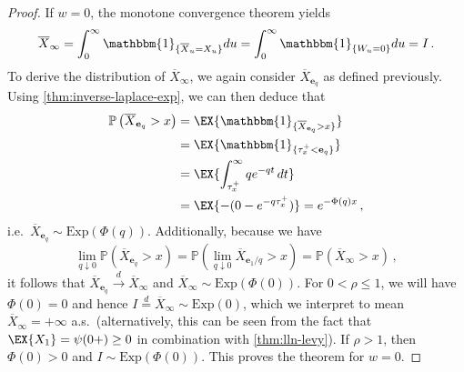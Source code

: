 \documentclass[titlepage]{article}
\theoremstyle{plain}
\theoremstyle{definition}
\DeclareRobustCommand{\probX}[2][{\mathbb{P}}]{\ensuremath{ {#1}\left( {#2} \right)}}
\begin{document}
\begin{proof}
  If $w = 0$, the monotone convergence theorem yields
  \begin{equation}
    \overline{X}_\infty = \int_0^\infty \mathbbm{1}_{\{ \overline{X}_u = X_u \}} du = \int_0^\infty \mathbbm{1}_{\{ W_u = 0 \}} du = I \,.
  \end{equation}
  To derive the distribution of $\overline{X}_\infty$, we again consider $\overline{X}_{\mathbf{e}_q}$ as defined previously. Using \cref{thm:inverse-laplace-exp}, we can then deduce that
  \begin{align}
    \probX{\overline{X}_{\mathbf{e}_q} > x} & = \EX{\mathbbm{1}_{\{\overline{X}_{\mathbf{e}_q} > x \}}} \\
                                            & = \EX{\mathbbm{1}_{\{ \tau_x^+ < \mathbf{e}_q \}}}        \\
                                            & = \EX{\int_{\tau_x^+}^\infty q e^{-qt} \, dt}             \\
                                            & = \EX{-(0 - e^{-q \tau_x^+})} = e^{-\Phi(q)x} \,,
  \end{align}
  i.e.\ $\overline{X}_{\mathbf{e}_q} \sim \mathrm{Exp}(\Phi(q))$. Additionally, because we have
  \begin{equation}
    \lim_{q \downarrow 0} \probX{\overline{X}_{\mathbf{e}_q} > x} = \probX{\lim_{q \downarrow 0} \overline{X}_{\mathbf{e}_1 / q} > x} = \probX{\overline{X}_\infty > x} \,,
  \end{equation}
  it follows that $\overline{X}_{\mathbf{e}_q} \xrightarrow{d} \overline{X}_\infty$ and $\overline{X}_\infty \sim \mathrm{Exp}(\Phi(0))$. For $0 < \rho \leq 1$, we will have $\Phi(0) = 0$ and hence $I \overset{d}{=} \overline{X}_\infty \sim \mathrm{Exp}(0)$, which we interpret to mean $\overline{X}_\infty = +\infty$ a.s.\ (alternatively, this can be seen from the fact that $\EX{X_1} = \psi(0+) \geq 0$ in combination with \cref{thm:lln-levy}). If $\rho > 1$, then $\Phi(0) > 0$ and $I \sim \mathrm{Exp}(\Phi(0))$. This proves the theorem for $w = 0$.


\end{proof}
\end{document}
